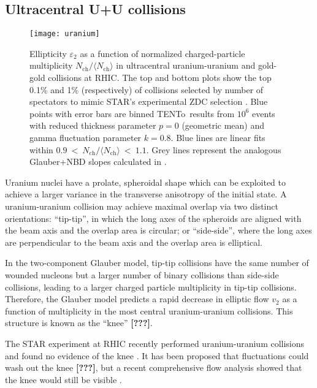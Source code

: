 \documentclass[aps,prl,reprint,amsmath,nofootinbib]{revtex4-1}
\newcommand{\trento}{T\raisebox{-.5ex}{R}ENTo}
\newcommand{\nch}{N_\text{ch}}
\newcommand{\needcite}{\textbf{[???]}}
\begin{document}
\subsection{Ultracentral U+U collisions}

\begin{figure}[b]
  \centering
  \texttt{[image: uranium]}
  \caption{
    \label{fig:uranium}
    Ellipticity $\varepsilon_2$ as a function of normalized charged-particle multiplicity
    $\nch/\langle\nch\rangle$ in ultracentral uranium-uranium and gold-gold collisions at RHIC.  The top and
    bottom plots show the top 0.1\% and 1\% (respectively) of collisions selected by number of spectators to
    mimic STAR's experimental ZDC selection \cite{FortheSTAR:2013bza}.  Blue points with error bars are binned
    \protect\trento\ results from $10^6$ events with reduced thickness parameter $p = 0$ (geometric mean) and
    gamma fluctuation parameter $k = 0.8$.  Blue lines are linear fits within
    $0.9~<~\nch/\langle\nch\rangle~<~1.1$.  Grey lines represent the analogous Glauber+NBD slopes calculated
    in \cite{FortheSTAR:2013bza}.
  }
\end{figure}

Uranium nuclei have a prolate, spheroidal shape which can be exploited to achieve a larger variance in the transverse anisotropy 
of the initial state. A uranium-uranium collision may achieve maximal overlap via two distinct orientations: 
``tip-tip'', in which the long axes of the spheroids are aligned with the beam axis and the overlap area is circular; or ``side-side'', 
where the long axes are perpendicular to the beam axis and the overlap area is elliptical. 


In the two-component Glauber model, tip-tip collisions have the same number of wounded nucleons but a larger number of binary
collisions than side-side collisions, leading to a larger charged particle multiplicity in tip-tip collisions. Therefore, the Glauber model predicts a
rapid decrease in elliptic flow $v_2$ as a function of multiplicity in the most central uranium-uranium
collisions.  This structure is known as the ``knee'' \needcite.

The STAR experiment at RHIC recently performed uranium-uranium collisions and found no evidence of the knee
\cite{FortheSTAR:2013bza}.  It has been proposed that fluctuations could wash out the knee \needcite, but a recent
comprehensive flow analysis showed that the knee would still be visible \cite{osu}.
\end{document}
